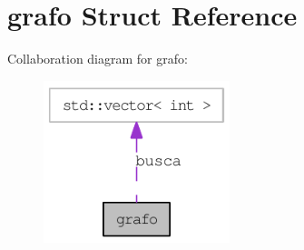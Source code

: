 \hypertarget{structgrafo}{
\section{grafo Struct Reference}
\label{structgrafo}
}
Collaboration diagram for grafo:\nopagebreak
\begin{figure}[H]
\begin{center}
\leavevmode
\includegraphics[width=154pt]{structgrafo__coll__graph}
\end{center}
\end{figure}
